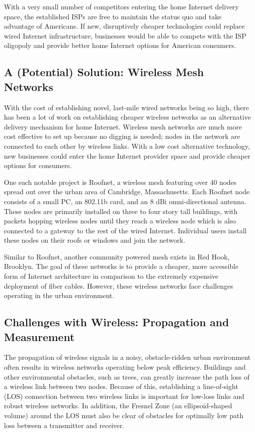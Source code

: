 \documentclass[pageno]{jpaper}
\begin{document}
With a very small number of competitors entering the home Internet delivery space, the established ISPs are free to maintain the status quo and take advantage of Americans. If new, disruptively cheaper technologies could replace wired Internet infrastructure, businesses would be able to compete with the ISP oligopoly and provide better home Internet options for American consumers.

\subsection{A (Potential) Solution: Wireless Mesh Networks}
With the cost of establishing novel, last-mile wired networks being so high, there has been a lot of work on establishing cheaper wireless networks as an alternative delivery mechanism for home Internet. Wireless mesh networks are much more cost effective to set up because no digging is needed; nodes in the network are connected to each other by wireless links. With a low cost alternative technology, new businesses could enter the home Internet provider space and provide cheaper options for consumers. 

 One such notable project is Roofnet\cite{roofnet}, a wireless mesh featuring over 40 nodes spread out over the urban area of Cambridge, Massachusetts. Each Roofnet node consists of a small PC, an 802.11b card, and an 8 dBi omni-directional antenna. These nodes are primarily installed on three to four story tall buildings, with packets hopping wireless nodes until they reach a wireless node which is also connected to a gateway to the rest of the wired Internet. Individual users install these nodes on their roofs or windows and join the network. 

Similar to Roofnet, another community powered mesh exists in Red Hook, Brooklyn\cite{redhook}. The goal of these networks is to provide a cheaper, more accessible form of Internet architecture in comparison to the extremely expensive deployment of fiber cables. However, these wireless networks face challenges operating in the urban environment.

\subsection{Challenges with Wireless: Propagation and Measurement}
The propagation of wireless signals in a noisy, obstacle-ridden urban environment often results in wireless networks operating below peak efficiency. Buildings and other environmental obstacles, such as trees, can greatly increase the path loss of a wireless link between two nodes. Because of this, establishing a line-of-sight (LOS) connection between two wireless links is important for low-loss links and robust wireless networks. In addition, the Fresnel Zone (an ellipsoid-shaped volume) around the LOS must also be clear of obstacles for optimally low path loss between a transmitter and receiver. 
\end{document}
